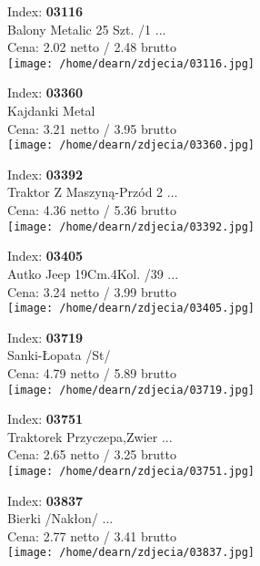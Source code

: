 {Index: \textbf{03116}\\
Balony Metalic 25 Szt. /1 ...\\
Cena: 2.02 netto / 2.48 brutto\\
  \texttt{[image: /home/dearn/zdjecia/03116.jpg]}}\newline\newline

{Index: \textbf{03360}\\
Kajdanki Metal  \\
Cena: 3.21 netto / 3.95 brutto\\
  \texttt{[image: /home/dearn/zdjecia/03360.jpg]}}\newline\newline

{Index: \textbf{03392}\\
Traktor Z Maszyną-Przód 2 ...\\
Cena: 4.36 netto / 5.36 brutto\\
  \texttt{[image: /home/dearn/zdjecia/03392.jpg]}}\newline\newline

{Index: \textbf{03405}\\
Autko Jeep 19Cm.4Kol. /39 ...\\
Cena: 3.24 netto / 3.99 brutto\\
  \texttt{[image: /home/dearn/zdjecia/03405.jpg]}}\newline\newline

{Index: \textbf{03719}\\
Sanki-Łopata  /St/\\
Cena: 4.79 netto / 5.89 brutto\\
  \texttt{[image: /home/dearn/zdjecia/03719.jpg]}}\newline\newline

{Index: \textbf{03751}\\
Traktorek Przyczepa,Zwier ...\\
Cena: 2.65 netto / 3.25 brutto\\
  \texttt{[image: /home/dearn/zdjecia/03751.jpg]}}\newline\newline

{Index: \textbf{03837}\\
Bierki /Nakłon/           ...\\
Cena: 2.77 netto / 3.41 brutto\\
  \texttt{[image: /home/dearn/zdjecia/03837.jpg]}}\newline\newline


